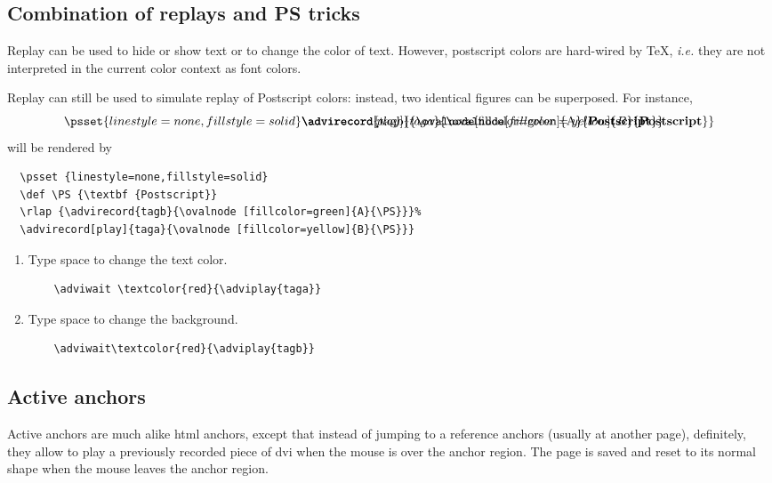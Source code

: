 \documentclass[12pt]{article}
\begin{document}
\newpage

\subsection* {Combination of replays and PS tricks}

Replay can be used to hide or show text or to change the color of text. 
However, postscript colors are hard-wired by {\TeX}, {\em i.e.} they are not
interpreted in the current color context as font colors. 

Replay can still be used to simulate replay of Postscript colors: instead, 
two identical figures can be superposed. For instance, 
$$
\psset {linestyle=none,fillstyle=solid}
\rlap
{\advirecord{tagb}{\ovalnode [fillcolor=green]{A}{\textbf {Postscript}}}}%
\advirecord[play]{taga}{\ovalnode [fillcolor=yellow]{B}{\textbf {Postscript}}}
$$
will  be rendered by
\begin{verbatim}
  \psset {linestyle=none,fillstyle=solid}
  \def \PS {\textbf {Postscript}}
  \rlap {\advirecord{tagb}{\ovalnode [fillcolor=green]{A}{\PS}}}%
  \advirecord[play]{taga}{\ovalnode [fillcolor=yellow]{B}{\PS}}}
\end{verbatim}
\begin {enumerate}

\item
Type space to change the text color. 
\adviwait \textcolor{red}{}
\begin{verbatim}
    \adviwait \textcolor{red}{\adviplay{taga}}
\end{verbatim}

\item
Type space to change the background.
\adviwait\textcolor{red}{}
\begin{verbatim}
    \adviwait\textcolor{red}{\adviplay{tagb}}
\end{verbatim}

\end {enumerate}


\newpage

\subsection*{Active anchors}

Active anchors are much alike html anchors, except that instead of
jumping to a reference anchors (usually at another page), definitely, they 
allow to play a previously recorded piece of dvi when the mouse is over the
anchor region. The page is saved and reset to its normal shape when the mouse
leaves the anchor region. 
\end{document}
